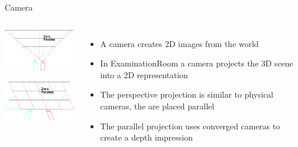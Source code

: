 \documentclass[12pt,ucs,hyperref={pdftext}]{beamer}
\newlength{\columnleft}
\newlength{\columnright}
\begin{document}
\begin{frame}{Camera}
\begin{columns}

\column{\columnleft}

\begin{center}
\includegraphics[width=4.5cm]{media/camera-perspective.pdf}

\bigskip

\includegraphics[width=4.5cm]{media/camera-parallel.pdf}
\end{center}

\column{\columnright}
\begin{itemize}%
\item A camera creates 2D images from the world
\item In ExaminationRoom a camera projects the 3D scene into a 2D representation
\item The perspective projection is similar to physical cameras, the are placed parallel
\item The parallel projection uses converged cameras to create a depth impression
\end{itemize}

\end{columns}
\end{frame}
\end{document}
